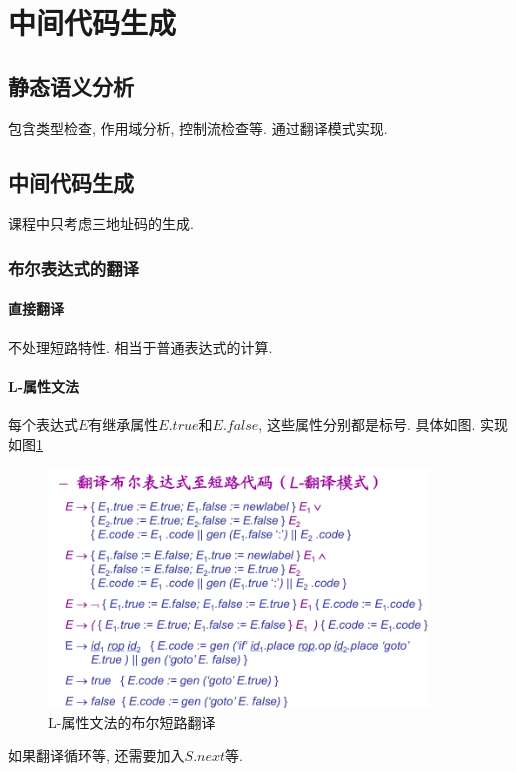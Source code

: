 \documentclass{ctexart}
\begin{document}
\section{中间代码生成}
\subsection{静态语义分析}
    包含类型检查, 作用域分析, 控制流检查等. 通过翻译模式实现.
\subsection{中间代码生成}
    课程中只考虑三地址码的生成.
\subsubsection{布尔表达式的翻译}
\paragraph{直接翻译} 不处理短路特性. 相当于普通表达式的计算.
\paragraph{L-属性文法}
    每个表达式$E$有继承属性$E.true$和$E.false$, 这些属性分别都是标号. 具体如图.
    实现如图\ref{bool-1}
    \begin{figure}[ht]
    \centering
    \includegraphics[width=0.9\textwidth]{bool-1.png}
    \caption{L-属性文法的布尔短路翻译}
    \label{bool-1}
    \end{figure}
    如果翻译循环等, 还需要加入$S.next$等.
\end{document}
